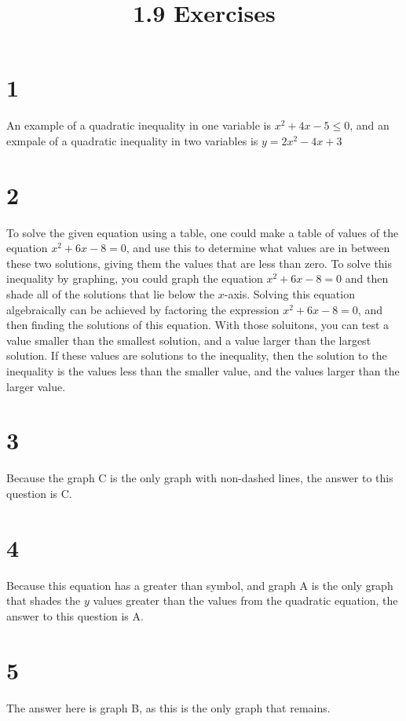 \documentclass{article}
\title{1.9 Exercises}
\theoremstyle{definition}
\begin{document}
\maketitle

\section*{1}
An example of a quadratic inequality in one variable is $x^2+4x-5\le 0$, and an exmpale of a quadratic inequality in two variables is 
$y=2x^2-4x+3$

\section*{2}
To solve the given equation using a table, one could make a table of values of the equation $x^2+6x-8=0$, and use this to determine what values are 
in between these two solutions, giving them the values that are less than zero. To solve this inequality by graphing, you could graph the equation $x^2+6x
-8=0$ and then shade all of the solutions that lie below the $x$-axis. Solving this equation algebraically can be achieved by factoring the expression 
$x^2+6x-8=0$, and then finding the solutions of this equation. With those soluitons, you can test a value smaller than the smallest solution, and a value 
larger than the largest solution. If these values are solutions to the inequality, then the solution to the inequality is the values less than the smaller 
value, and the values larger than the larger value.

\section*{3}
Because the graph C is the only graph with non-dashed lines, the answer to this question is C.

\section*{4}
Because this equation has a greater than symbol, and graph A is the only graph that shades the $y$ values greater than the values from the quadratic 
equation, the answer to this question is A.

\section*{5}
The answer here is graph B, as this is the only graph that remains.
\end{document}
